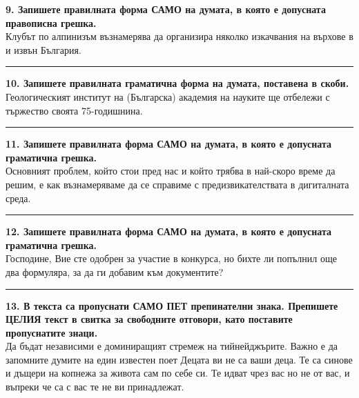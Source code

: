 \documentclass[12pt,a4paper]{article}
\begin{document}
\noindent
\textbf{9. Запишете правилната форма САМО на думата, в която е допусната правописна грешка.} \\
Клубът по алпинизъм възнамерява да организира няколко изкачвания на върхове в и извън България.

\vspace{0.2cm}
\noindent\rule{\linewidth}{0.4pt}

\vspace{0.6cm}

\noindent
\textbf{10. Запишете правилната граматична форма на думата, поставена в скоби.} \\
Геологическият институт на (Българска) академия на науките ще отбележи с тържество своята 75-годишнина.

\vspace{0.2cm}
\noindent\rule{\linewidth}{0.4pt}

\vspace{0.6cm}

\noindent
\textbf{11. Запишете правилната форма САМО на думата, в която е допусната граматична грешка.} \\
Основният проблем, който стои пред нас и който трябва в най-скоро време да решим, е как възнамеряваме да се справиме с предизвикателствата в дигиталната среда.

\vspace{0.2cm}
\noindent\rule{\linewidth}{0.4pt}

\vspace{0.6cm}

\noindent
\textbf{12. Запишете правилната форма САМО на думата, в която е допусната граматична грешка.} \\
Господине, Вие сте одобрен за участие в конкурса, но бихте ли попълнил още два формуляра, за да ги добавим към документите?

\vspace{0.2cm}
\noindent\rule{\linewidth}{0.4pt}

\vspace{0.6cm}

\noindent
\textbf{13. В текста са пропуснати САМО ПЕТ препинателни знака. Препишете ЦЕЛИЯ текст в свитка за свободните отговори, като поставите пропуснатите знаци.} \\
Да бъдат независими е доминиращият стремеж на тийнейджърите. Важно е да запомните думите на един известен поет Децата ви не са ваши деца. Те са синове и дъщери на копнежа за живота сам по себе си. Те идват чрез вас но не от вас, и въпреки че са с вас те не ви принадлежат.
\end{document}
